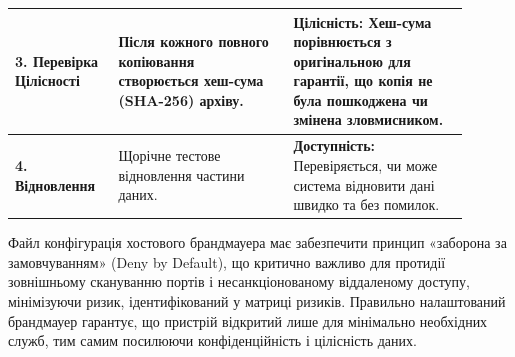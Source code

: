 \begin{longtable}{|
    >{\raggedright\arraybackslash}p{0.2\linewidth}| %
    >{\raggedright\arraybackslash}p{0.35\linewidth}| %
    >{\raggedright\arraybackslash}p{0.35\linewidth}| %
    }
    \textbf{3. Перевірка Цілісності} & 
    Після кожного повного копіювання створюється хеш-сума (SHA-256) архіву. & 
    \begin{minipage}[t]{\linewidth}
        \vspace{1mm}
        \textbf{Цілісність:} Хеш-сума порівнюється з оригінальною для гарантії, що копія не була пошкоджена чи змінена зловмисником.
        \vspace{1mm}
    \end{minipage} \\
    \hline

    \textbf{4. Відновлення} & 
    Щорічне тестове відновлення частини даних. & 
    \textbf{Доступність:} Перевіряється, чи може система відновити дані швидко та без помилок. \\

\end{longtable}

Файл конфігурація хостового брандмауера має забезпечити принцип «заборона за замовчуванням» (Deny by Default), що критично важливо для протидії зовнішньому скануванню портів і несанкціонованому віддаленому доступу, мінімізуючи ризик, ідентифікований у матриці ризиків. Правильно налаштований брандмауер гарантує, що пристрій відкритий лише для мінімально необхідних служб, тим самим посилюючи конфіденційність і цілісність даних.


